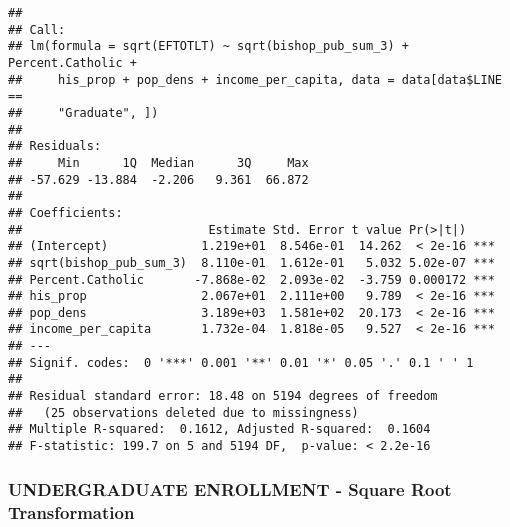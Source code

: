 \documentclass[]{article}
\newenvironment{Shaded}{\begin{snugshade}}{\end{snugshade}}
\newcommand{\KeywordTok}[1]{\textcolor[rgb]{0.13,0.29,0.53}{\textbf{#1}}}
\newcommand{\DataTypeTok}[1]{\textcolor[rgb]{0.13,0.29,0.53}{#1}}
\newcommand{\DecValTok}[1]{\textcolor[rgb]{0.00,0.00,0.81}{#1}}
\newcommand{\StringTok}[1]{\textcolor[rgb]{0.31,0.60,0.02}{#1}}
\newcommand{\OperatorTok}[1]{\textcolor[rgb]{0.81,0.36,0.00}{\textbf{#1}}}
\newcommand{\NormalTok}[1]{#1}
\begin{document}
\begin{verbatim}
## 
## Call:
## lm(formula = sqrt(EFTOTLT) ~ sqrt(bishop_pub_sum_3) + Percent.Catholic + 
##     his_prop + pop_dens + income_per_capita, data = data[data$LINE == 
##     "Graduate", ])
## 
## Residuals:
##     Min      1Q  Median      3Q     Max 
## -57.629 -13.884  -2.206   9.361  66.872 
## 
## Coefficients:
##                          Estimate Std. Error t value Pr(>|t|)    
## (Intercept)             1.219e+01  8.546e-01  14.262  < 2e-16 ***
## sqrt(bishop_pub_sum_3)  8.110e-01  1.612e-01   5.032 5.02e-07 ***
## Percent.Catholic       -7.868e-02  2.093e-02  -3.759 0.000172 ***
## his_prop                2.067e+01  2.111e+00   9.789  < 2e-16 ***
## pop_dens                3.189e+03  1.581e+02  20.173  < 2e-16 ***
## income_per_capita       1.732e-04  1.818e-05   9.527  < 2e-16 ***
## ---
## Signif. codes:  0 '***' 0.001 '**' 0.01 '*' 0.05 '.' 0.1 ' ' 1
## 
## Residual standard error: 18.48 on 5194 degrees of freedom
##   (25 observations deleted due to missingness)
## Multiple R-squared:  0.1612, Adjusted R-squared:  0.1604 
## F-statistic: 199.7 on 5 and 5194 DF,  p-value: < 2.2e-16
\end{verbatim}

\subsubsection{UNDERGRADUATE ENROLLMENT - Square Root
Transformation}\label{undergraduate-enrollment---square-root-transformation}

\begin{Shaded}
\end{Shaded}
\end{document}
